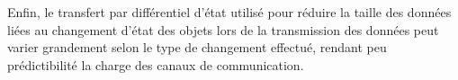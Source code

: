 Enfin, le transfert par différentiel d'état utilisé pour réduire la taille des 
données liées au changement d'état des objets lors de la transmission des 
données peut varier grandement selon le type de changement 
effectué, rendant peu prédictibilité la charge des canaux de communication. 
%
